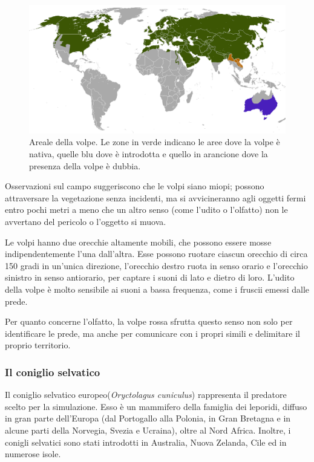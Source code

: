 \documentclass[11pt]{article}
\begin{document}
\begin{figure}[h]
    \centering
    \includegraphics[scale = 0.3]{ArealeDellaVolpe.png}
    \caption{Areale della volpe. Le zone in verde indicano le aree dove la volpe è nativa, quelle blu dove è introdotta e quello in arancione dove la presenza della volpe è dubbia. }
    \label{figArealeVolpe}
\end{figure}

Osservazioni sul campo\cite{RedFox} suggeriscono che le volpi siano miopi; possono attraversare la vegetazione senza incidenti, ma si avvicineranno agli oggetti fermi entro pochi metri a meno che un altro senso (come l'udito o l'olfatto) non le avvertano del pericolo o l'oggetto si muova. 

Le volpi hanno due orecchie altamente mobili, che possono essere mosse indipendentemente l'una dall'altra. Esse possono ruotare ciascun orecchio di circa 150 gradi in un'unica direzione, l'orecchio destro ruota in senso orario e l'orecchio sinistro in senso antiorario, per captare i suoni di lato e dietro di loro. L'udito della volpe è molto sensibile ai suoni a bassa frequenza, come i fruscii emessi dalle prede. 

Per quanto concerne l'olfatto, la volpe rossa sfrutta questo senso non solo per identificare le prede, ma anche per comunicare con i propri simili e delimitare il proprio territorio.


\subsubsection{Il coniglio selvatico}
\label{coniglio}
Il coniglio selvatico europeo(\emph{Oryctolagus cuniculus}) rappresenta il predatore scelto per la simulazione. Esso \cite{WikiConiglio} è un mammifero della famiglia dei leporidi, diffuso in gran parte dell'Europa (dal Portogallo alla Polonia, in Gran Bretagna e in alcune parti della Norvegia, Svezia e Ucraina), oltre al Nord Africa. Inoltre, i conigli selvatici sono stati introdotti in  Australia, Nuova Zelanda, Cile ed in numerose isole. 
\end{document}
